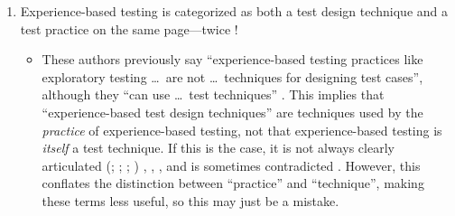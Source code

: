 \begin{enumerate}
      \item Experience-based testing is categorized as both a test design
            technique and a test practice on the same page---twice
            \citep[Fig.~2,~p.~34]{IEEE2022}!
            \ifnotpaper
                  \begin{itemize}
                        \item These authors previously say ``experience-based testing
                              practices like exploratory testing \dots\ are not
                              \dots\ techniques for designing test cases'', although
                              they ``can use \dots\ test techniques''
                              \citeyearpar[p.~viii]{IEEE2021}. This implies that
                              ``experience-based test design techniques'' are
                              techniques used by the \emph{practice} of experience-based
                              testing, not that experience-based testing is
                              \emph{itself} a test technique. If this is the case, it
                              is not always clearly articulated
                              \ifnotpaper
                                    (\citealp[pp.~4,~22]{IEEE2022}; \citeyear[p.~4]{IEEE2021};
                                    \citealp[p.~5-13]{SWEBOK2024}; \citealpISTQB{})
                              \else
                                    \cite[pp.~4,~22]{IEEE2022}, \cite[p.~4]{IEEE2021},
                                    \cite[p.~5-13]{SWEBOK2024}, \cite{ISTQB}
                              \fi
                              and is
                              sometimes contradicted \citep[p.~46]{Firesmith2015}.
                              However, this conflates the distinction between
                              ``practice'' and ``technique'', making these terms less
                              useful, so this may just be a mistake.


\end{itemize}
\end{enumerate}
